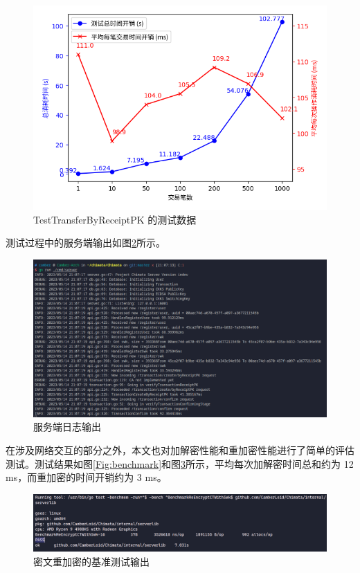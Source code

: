 \begin{figure}[h]
    \centering
    \includegraphics[width=0.9\linewidth]{./Figures/matplots/Bench_CreateTransferJobByReceiptPK.png}
    \caption{TestTransferByReceiptPK 的测试数据}\label{Fig:graph_bench_transaction}
\end{figure}

测试过程中的服务端输出如图\ref{Fig:server}所示。

\begin{figure}[h]
    \centering
    \includegraphics[width=0.9\linewidth]{./Figures/Server_ReceiptPK.png}
    \caption{服务端日志输出}\label{Fig:server}
\end{figure}

在涉及网络交互的部分之外，本文也对加解密性能和重加密性能进行了简单的评估测试。测试结果如图\ref{Fig:benchmark}和图\ref{Fig:bench_reencrypt}所示，平均每次加解密时间总和约为 12 ms，而重加密的时间开销约为 3 ms。

\begin{figure}[h]
    \centering
    \includegraphics[width=0.9\linewidth]{./Figures/Bench_ReEncrypt.png}
    \caption{密文重加密的基准测试输出}\label{Fig:bench_reencrypt}
\end{figure}

